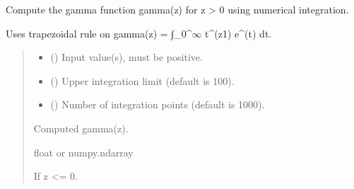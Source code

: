 \documentclass[a4paper,10pt,english]{sphinxmanual}
\begin{document}
\begin{fulllineitems}
\label{\detokenize{index:acsefunctions.special.gamma}}
\pysigstartsignatures
\pysiglinewithargsret
{}
{\sphinxparamcomma {}\sphinxparamcomma {}}
{}
\pysigstopsignatures
\sphinxAtStartPar
Compute the gamma function gamma(z) for z \textgreater{} 0 using numerical integration.

\sphinxAtStartPar
Uses trapezoidal rule on gamma(z) = ∫\_0\textasciicircum{}\(\infty\) t\textasciicircum{}(z\sphinxhyphen{}1) e\textasciicircum{}(\sphinxhyphen{}t) dt.
\begin{quote}\begin{description}
\begin{itemize}
\item {} 
\sphinxAtStartPar
{} () \textendash{} Input value(s), must be positive.

\item {} 
\sphinxAtStartPar
{} (\sphinxstyleliteralemphasis{\sphinxupquote{, }}) \textendash{} Upper integration limit (default is 100).

\item {} 
\sphinxAtStartPar
{} (\sphinxstyleliteralemphasis{\sphinxupquote{, }}) \textendash{} Number of integration points (default is 1000).

\end{itemize}

\sphinxAtStartPar
Computed gamma(z).

\sphinxAtStartPar
float or numpy.ndarray

\sphinxAtStartPar
{} \textendash{} If z \textless{}= 0.

\end{description}\end{quote}

\end{fulllineitems}
\end{document}
